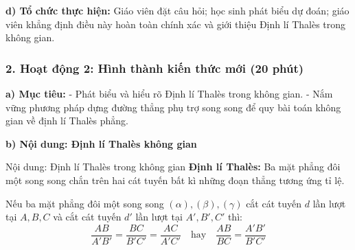 \documentclass[12pt, a4paper]{article}
\begin{document}
\noindent \textbf{d) Tổ chức thực hiện:}
Giáo viên đặt câu hỏi; học sinh phát biểu dự đoán; giáo viên khẳng định điều này hoàn toàn chính xác và giới thiệu Định lí Thalès trong không gian.

\subsubsection*{2. Hoạt động 2: Hình thành kiến thức mới (20 phút)}

\noindent \textbf{a) Mục tiêu:}
- Phát biểu và hiểu rõ Định lí Thalès trong không gian.
- Nắm vững phương pháp dựng đường thẳng phụ trợ song song để quy bài toán không gian về định lí Thalès phẳng.

\noindent \textbf{b) Nội dung: Định lí Thalès không gian}
\begin{pedabox}{Nội dung: Định lí Thalès trong không gian}
\textbf{Định lí Thalès:}
Ba mặt phẳng đôi một song song chắn trên hai cát tuyến bất kì những đoạn thẳng tương ứng tỉ lệ.
\begin{center}
\end{center}
Nếu ba mặt phẳng đôi một song song $(\alpha), (\beta), (\gamma)$ cắt cát tuyến $d$ lần lượt tại $A, B, C$ và cắt cát tuyến $d'$ lần lượt tại $A', B', C'$ thì:
$$\dfrac{AB}{A'B'} = \dfrac{BC}{B'C'} = \dfrac{AC}{A'C'} \quad \text{hay} \quad \dfrac{AB}{BC} = \dfrac{A'B'}{B'C'}$$
\end{pedabox}
\end{document}
